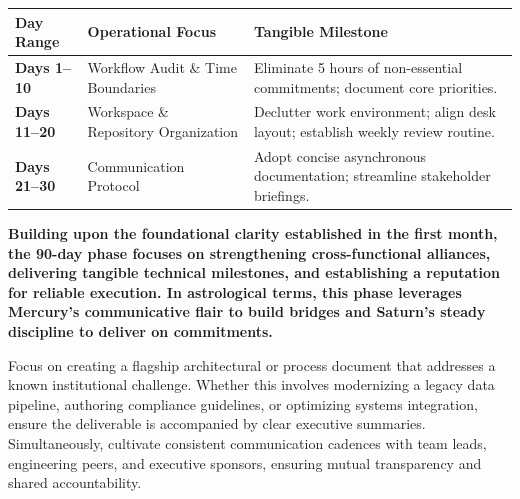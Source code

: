 
\begin{highlightcard}
  \sffamily\fontsize{8}{11.5}\selectfont
  \begin{tabularx}{\linewidth}{@{}l l X@{}}
    \toprule
    \textbf{Day Range} & \textbf{Operational Focus} & \textbf{Tangible Milestone} \\
    \midrule
    \textbf{Days 1--10} & Workflow Audit \& Time Boundaries & Eliminate 5 hours of non-essential commitments; document core priorities. \\
    \textbf{Days 11--20} & Workspace \& Repository Organization & Declutter work environment; align desk layout; establish weekly review routine. \\
    \textbf{Days 21--30} & Communication Protocol & Adopt concise asynchronous documentation; streamline stakeholder briefings. \\
    \bottomrule
  \end{tabularx}
\end{highlightcard}\vspace{2mm}

\label{topic69}

{\fontsize{9.5}{13.8}\selectfont\bfseries\color{DeepSlate} Building upon the foundational clarity established in the first month, the 90-day phase focuses on strengthening cross-functional alliances, delivering tangible technical milestones, and establishing a reputation for reliable execution. In astrological terms, this phase leverages Mercury's communicative flair to build bridges and Saturn's steady discipline to deliver on commitments.}\par\vspace{2mm}

{\fontsize{9}{13}\selectfont Focus on creating a flagship architectural or process document that addresses a known institutional challenge. Whether this involves modernizing a legacy data pipeline, authoring compliance guidelines, or optimizing systems integration, ensure the deliverable is accompanied by clear executive summaries. Simultaneously, cultivate consistent communication cadences with team leads, engineering peers, and executive sponsors, ensuring mutual transparency and shared accountability.}\par\vspace{1.8mm}

